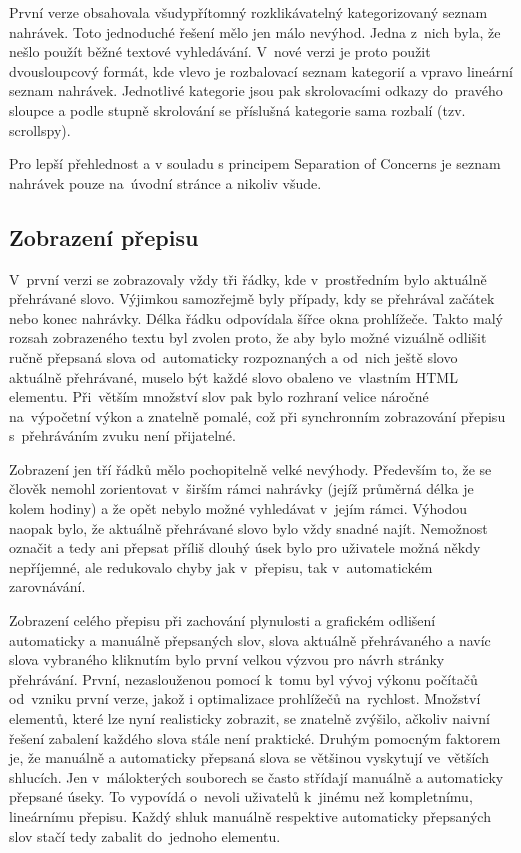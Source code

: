 První verze obsahovala všudypřítomný rozklikávatelný kategorizovaný seznam
nahrávek. Toto jednoduché řešení mělo jen málo nevýhod. Jedna z~nich byla, že
nešlo použít běžné textové vyhledávání. V~nové verzi je proto použit
dvousloupcový formát, kde vlevo je rozbalovací seznam kategorií a vpravo
lineární seznam nahrávek. Jednotlivé kategorie jsou pak skrolovacími odkazy
do~pravého sloupce a podle stupně skrolování se příslušná kategorie sama
rozbalí (tzv. scrollspy).

Pro lepší přehlednost a v souladu s principem Separation of Concerns je seznam
nahrávek pouze na~úvodní stránce a nikoliv všude.

\subsection{Zobrazení přepisu}

V~první verzi se zobrazovaly vždy tři řádky, kde v~prostředním bylo aktuálně
přehrávané slovo. Výjimkou samozřejmě byly případy, kdy se přehrával začátek
nebo konec nahrávky. Délka řádku odpovídala šířce okna prohlížeče. Takto malý
rozsah zobrazeného textu byl zvolen proto, že aby bylo možné vizuálně odlišit
ručně přepsaná slova od~automaticky rozpoznaných a od~nich ještě slovo aktuálně
přehrávané, muselo být každé slovo obaleno ve~vlastním HTML elementu. Při~větším
množství slov pak bylo rozhraní velice náročné na~výpočetní výkon a znatelně
pomalé, což při synchronním zobrazování přepisu s~přehráváním zvuku není
přijatelné.

Zobrazení jen tří řádků mělo pochopitelně velké nevýhody. Především to, že se
člověk nemohl zorientovat v~širším rámci nahrávky (jejíž průměrná délka je kolem
hodiny) a že opět nebylo možné vyhledávat v~jejím rámci. Výhodou naopak bylo, že
aktuálně přehrávané slovo bylo vždy snadné najít. Nemožnost označit a tedy ani
přepsat příliš dlouhý úsek bylo pro uživatele možná někdy nepříjemné, ale
redukovalo chyby jak v~přepisu, tak v~automatickém zarovnávání.

Zobrazení celého přepisu při zachování plynulosti a grafickém odlišení
automaticky a manuálně přepsaných slov, slova aktuálně přehrávaného a navíc
slova vybraného kliknutím bylo první velkou výzvou pro návrh stránky přehrávání.
První, nezaslouženou pomocí k~tomu byl vývoj výkonu počítačů od~vzniku první
verze, jakož i optimalizace prohlížečů na~rychlost. Množství elementů, které lze
nyní realisticky zobrazit, se znatelně zvýšilo, ačkoliv naivní řešení zabalení
každého slova stále není praktické. Druhým pomocným faktorem je, že manuálně a
automaticky přepsaná slova se většinou vyskytují ve~větších shlucích. Jen
v~málokterých souborech se často střídají manuálně a automaticky přepsané úseky.
To vypovídá o~nevoli uživatelů k~jinému než kompletnímu, lineárnímu přepisu.
Každý shluk manuálně respektive automaticky přepsaných slov stačí tedy zabalit
do~jednoho elementu.

